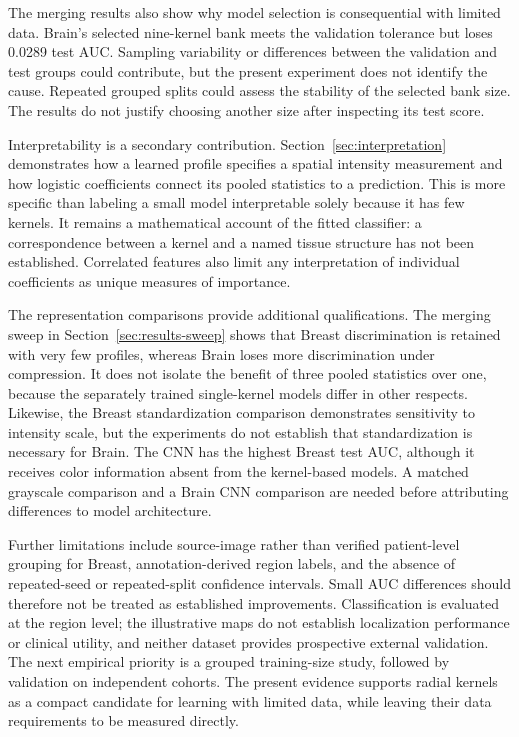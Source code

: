 \documentclass[10pt,twocolumn]{article}
\begin{document}
The merging results also show why model selection is consequential with limited data. Brain's selected nine-kernel bank meets the validation tolerance but loses 0.0289 test AUC. Sampling variability or differences between the validation and test groups could contribute, but the present experiment does not identify the cause. Repeated grouped splits could assess the stability of the selected bank size. The results do not justify choosing another size after inspecting its test score.

Interpretability is a secondary contribution. Section~\ref{sec:interpretation} demonstrates how a learned profile specifies a spatial intensity measurement and how logistic coefficients connect its pooled statistics to a prediction. This is more specific than labeling a small model interpretable solely because it has few kernels. It remains a mathematical account of the fitted classifier: a correspondence between a kernel and a named tissue structure has not been established. Correlated features also limit any interpretation of individual coefficients as unique measures of importance.

The representation comparisons provide additional qualifications. The merging sweep in Section~\ref{sec:results-sweep} shows that Breast discrimination is retained with very few profiles, whereas Brain loses more discrimination under compression. It does not isolate the benefit of three pooled statistics over one, because the separately trained single-kernel models differ in other respects. Likewise, the Breast standardization comparison demonstrates sensitivity to intensity scale, but the experiments do not establish that standardization is necessary for Brain. The CNN has the highest Breast test AUC, although it receives color information absent from the kernel-based models. A matched grayscale comparison and a Brain CNN comparison are needed before attributing differences to model architecture.

Further limitations include source-image rather than verified patient-level grouping for Breast, annotation-derived region labels, and the absence of repeated-seed or repeated-split confidence intervals. Small AUC differences should therefore not be treated as established improvements. Classification is evaluated at the region level; the illustrative maps do not establish localization performance or clinical utility, and neither dataset provides prospective external validation. The next empirical priority is a grouped training-size study, followed by validation on independent cohorts. The present evidence supports radial kernels as a compact candidate for learning with limited data, while leaving their data requirements to be measured directly.
\end{document}
